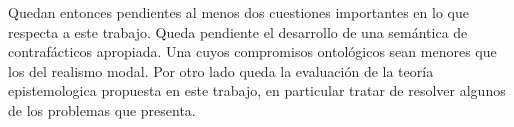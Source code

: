 Quedan entonces pendientes al menos dos cuestiones importantes en lo que respecta a este trabajo. Queda pendiente el desarrollo de una semántica de contrafácticos apropiada. Una cuyos compromisos ontológicos sean menores que los del realismo modal. Por otro lado queda la evaluación de la teoría epistemologica propuesta en este trabajo, en particular tratar de resolver algunos de los problemas que presenta.




